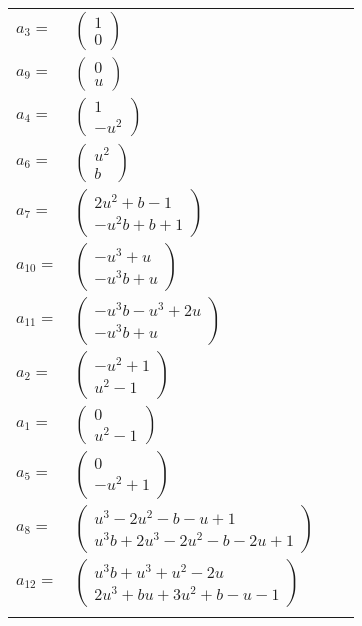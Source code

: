 \documentclass[1p]{elsarticle_modified}
\theoremstyle{definition}
\begin{document}
\begin{tabular}{m{7pt} m{180pt} m{7pt} m{180pt} }
\flushright $a_{3}=$&$\begin{pmatrix}1\\0\end{pmatrix}$ \\
\flushright $a_{9}=$&$\begin{pmatrix}0\\u\end{pmatrix}$ \\
\flushright $a_{4}=$&$\begin{pmatrix}1\\- u^2\end{pmatrix}$ \\
\flushright $a_{6}=$&$\begin{pmatrix}u^2\\b\end{pmatrix}$ \\
\flushright $a_{7}=$&$\begin{pmatrix}2 u^2+b-1\\- u^2 b+b+1\end{pmatrix}$ \\
\flushright $a_{10}=$&$\begin{pmatrix}- u^3+u\\- u^3 b+u\end{pmatrix}$ \\
\flushright $a_{11}=$&$\begin{pmatrix}- u^3 b- u^3+2 u\\- u^3 b+u\end{pmatrix}$ \\
\flushright $a_{2}=$&$\begin{pmatrix}- u^2+1\\u^2-1\end{pmatrix}$ \\
\flushright $a_{1}=$&$\begin{pmatrix}0\\u^2-1\end{pmatrix}$ \\
\flushright $a_{5}=$&$\begin{pmatrix}0\\- u^2+1\end{pmatrix}$ \\
\flushright $a_{8}=$&$\begin{pmatrix}u^3-2 u^2- b- u+1\\u^3 b+2 u^3-2 u^2- b-2 u+1\end{pmatrix}$ \\
\flushright $a_{12}=$&$\begin{pmatrix}u^3 b+u^3+u^2-2 u\\2 u^3+b u+3 u^2+b- u-1\end{pmatrix}$\\&\end{tabular}
\end{document}
